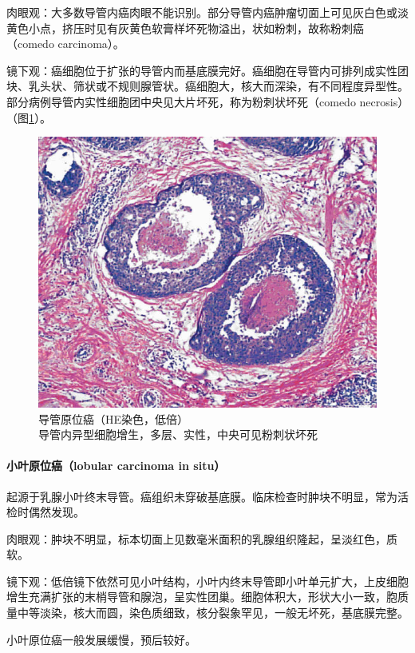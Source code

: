 肉眼观：大多数导管内癌肉眼不能识别。部分导管内癌肿瘤切面上可见灰白色或淡黄色小点，挤压时见有灰黄色软膏样坏死物溢出，状如粉刺，故称粉刺癌（comedo
carcinoma）。

镜下观：癌细胞位于扩张的导管内而基底膜完好。癌细胞在导管内可排列成实性团块、乳头状、筛状或不规则腺管状。癌细胞大，核大而深染，有不同程度异型性。部分病例导管内实性细胞团中央见大片坏死，称为粉刺状坏死（comedo
necrosis）（图\ref{fig11-15}）。

\begin{figure}[!htbp]
 \centering
 \includegraphics{./images/Image00202.jpg}
 \captionsetup{justification=centering}
 \caption{导管原位癌（HE染色，低倍）\\ {\small 导管内异型细胞增生，多层、实性，中央可见粉刺状坏死}}
\label{fig11-15}
  \end{figure}

\paragraph{小叶原位癌（lobular carcinoma in situ）}
起源于乳腺小叶终末导管。癌组织未穿破基底膜。临床检查时肿块不明显，常为活检时偶然发现。

肉眼观：肿块不明显，标本切面上见数毫米面积的乳腺组织隆起，呈淡红色，质软。

镜下观：低倍镜下依然可见小叶结构，小叶内终末导管即小叶单元扩大，上皮细胞增生充满扩张的末梢导管和腺泡，呈实性团巢。细胞体积大，形状大小一致，胞质量中等淡染，核大而圆，染色质细致，核分裂象罕见，一般无坏死，基底膜完整。

小叶原位癌一般发展缓慢，预后较好。

